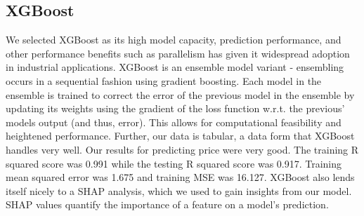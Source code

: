 \documentclass[10pt]{article}
\begin{document}
\subsection{XGBoost}

We selected XGBoost as its high model capacity, prediction performance, and other performance benefits such as parallelism has given it widespread adoption in industrial applications. XGBoost is an ensemble model variant - ensembling occurs in a sequential fashion using gradient boosting. Each model in the ensemble is trained to correct the error of the previous model in the ensemble by updating its weights using the gradient of the loss function w.r.t. the previous’ models output (and thus, error). This allows for computational feasibility and heightened performance. Further, our data is tabular, a data form that XGBoost handles very well. Our results for predicting price were very good. The training R squared score was 0.991 while the testing R squared score was 0.917. Training mean squared error was 1.675 and training MSE was 16.127. XGBoost also lends itself nicely to a SHAP analysis, which we used to gain insights from our model.  SHAP values quantify the importance of a feature on a model’s prediction.
\end{document}
